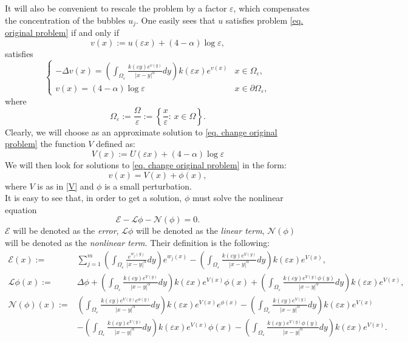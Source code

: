 \documentclass[11pt]{article}
\begin{document}
It will also be convenient to rescale the problem by a factor $\varepsilon$, which compensates the concentration of the bubbles $u_j$. One easily sees that $u$ satisfies problem \eqref{eq. original problem} if and only if
$$v(x):=u(\varepsilon x)+(4-\alpha)\log\varepsilon,$$
satisfies
\begin{equation}\label{eq. change original problem}
\left\{\begin{array}{ll}-\Delta v(x)=\left(\int_{\Omega_\varepsilon}\frac{k(\varepsilon y)e^{v(y)}}{|x-y|^\alpha}dy\right)k(\varepsilon x)e^{v(x)}&x\in\Omega_\varepsilon,\\v(x)=(4-\alpha)\log\varepsilon&x\in\partial\Omega_\varepsilon,
\end{array}\right.
\end{equation}
where
$$\Omega_\varepsilon:=\frac\Omega\varepsilon:=\left\{\frac x\varepsilon:\,x\in\Omega\right\}.$$
Clearly, we will choose as an approximate solution to \eqref{eq. change original problem} the function $V$ defined as:
\begin{equation}\label{V}
V(x):=U(\varepsilon x)+(4-\alpha)\log\varepsilon
\end{equation}
We will then look for solutions to \eqref{eq. change original problem} in the form:
$$v(x)=V(x)+\phi(x),$$
where $V$ is as in \eqref{V} and $\phi$ is a small perturbation.\\
It is easy to see that, in order to get a solution, $\phi$ must solve the nonlinear equation
\begin{equation}\label{probphi}
\boxed{\mathcal E-\mathcal L\phi-\mathcal N(\phi)=0.}
\end{equation}
$\mathcal E$ will be denoted as the \emph{error}, $\mathcal L\phi$ will be denoted as the \emph{linear term}, $\mathcal N(\phi)$ will be denoted as the \emph{nonlinear term}. Their definition is the following:
\begin{align}
\label{ELN}\mathcal E(x):=&\sum_{j=1}^m\left(\int_{\Omega_\varepsilon}\frac{e^{w_j(y)}}{|x-y|^\alpha}dy\right)e^{w_j(x)}-\left(\int_{\Omega_\varepsilon}\frac{k(\varepsilon y)e^{V(y)}}{|x-y|^\alpha}dy\right)k(\varepsilon x)e^{V(x)},\\
\nonumber\mathcal L\phi(x):=&\Delta\phi+\left(\int_{\Omega_\varepsilon}\frac{k(\varepsilon y)e^{V(y)}}{|x-y|^\alpha}dy\right)k(\varepsilon x)e^{V(x)}\phi(x)+\left(\int_{\Omega_\varepsilon}\frac{k(\varepsilon y)e^{V(y)}\phi(y)}{|x-y|^\alpha}dy\right)k(\varepsilon x)e^{V(x)},\\
\nonumber\mathcal N(\phi)(x):=&\left(\int_{\Omega_\varepsilon}\frac{k(\varepsilon y)e^{V(y)}e^{\phi(y)}}{|x-y|^\alpha}dy\right)k(\varepsilon x)e^{V(x)}e^{\phi(x)}-\left(\int_{\Omega_\varepsilon}\frac{k(\varepsilon y)e^{V(y)}}{|x-y|^\alpha}dy\right)k(\varepsilon x)e^{V(x)}\\
\nonumber&-\left(\int_{\Omega_\varepsilon}\frac{k(\varepsilon y)e^{V(y)}}{|x-y|^\alpha}dy\right)k(\varepsilon x)e^{V(x)}\phi(x)-\left(\int_{\Omega_\varepsilon}\frac{k(\varepsilon y)e^{V(y)}\phi(y)}{|x-y|^\alpha}dy\right)k(\varepsilon x)e^{V(x)}.
 \end{align}
\end{document}
